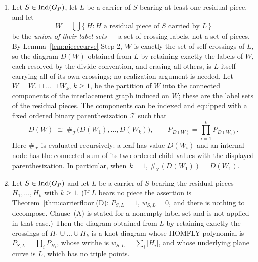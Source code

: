 \begin{corollary}\label{cor:groupedknot}
\begin{enumerate}
\item[(A)] Let $S\in\operatorname{Ind}(G_P)$, let $L$ be a carrier of $S$ bearing at least one residual
piece, and let
\[
   W=\bigcup\{\,H: H\text{ a residual piece of }S\text{ carried by }L\,\}
\]
be the \emph{union of their label sets} --- a set of crossing labels, not a set
of pieces. By Lemma~\ref{lem:piececurve} Step 2, $W$ is exactly the set of
self-crossings of $L$, so the diagram $D(W)$ obtained from $L$ by retaining
exactly the labels of $W$, each resolved by the divide convention, and erasing
all others, is $L$ itself carrying all of its own crossings; no realization
argument is needed. Let $W=W_1\sqcup\dots\sqcup W_k$, $k\geq1$, be the partition
of $W$ into the connected components of the interlacement graph induced on $W$;
these are the label sets of the residual pieces. The components can be indexed
and equipped with a fixed ordered binary parenthesization $\mathcal T$ such that
\[
D(W)\;\cong\;\#_{\mathcal T}
   \bigl(D(W_1),\dots,D(W_k)\bigr),
\qquad
P_{D(W)}=\prod_{i=1}^{k}P_{D(W_i)} .
\]
Here $\#_{\mathcal T}$ is evaluated recursively: a leaf has value $D(W_i)$
and an internal node has the connected sum of its two ordered child values
with the displayed parenthesization. In particular, when $k=1$,
$\#_{\mathcal T}(D(W_1))=D(W_1)$.
\item[(B)] Let $S\in\operatorname{Ind}(G_P)$ and let $L$ be a carrier of $S$ bearing the residual pieces
$H_1,\dots,H_k$ with $k\geq1$. (If $L$ bears no piece the assertion is
Theorem~\ref{thm:carrierfloor}(D): $P_{S,L}=1$, $w_{S,L}=0$, and there is nothing to
decompose. Clause~(A) is stated for a nonempty label set and
is not applied in that case.) Then the diagram obtained from $L$ by retaining exactly the
crossings of $H_1\cup\dots\cup H_k$ is a knot diagram whose HOMFLY polynomial is
$P_{S,L}=\prod_iP_{H_i}$, whose writhe is $w_{S,L}=\sum_i|H_i|$, and whose
underlying plane curve is $L$, which has no triple points.
\end{enumerate}
\end{corollary}
